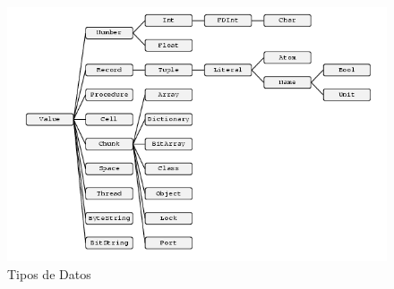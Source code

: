 \documentclass[10pt,journal,compsoc]{IEEEtran}
\begin{document}
\section{}
\begin{figure}
	\centering
	\includegraphics[width=\textwidth]{datos.png}
	\caption{\label{fig:Datos}Tipos de Datos}
\end{figure}
\end{document}
